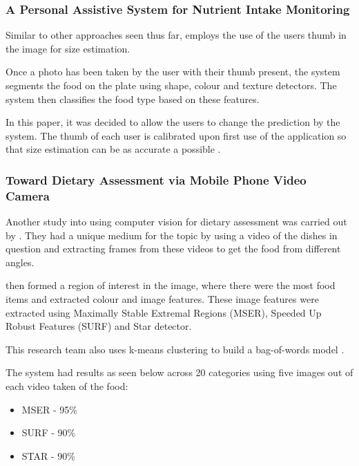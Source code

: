 
\subsubsection*{A Personal Assistive System for Nutrient Intake Monitoring}
Similar to other approaches seen thus far, \parencite{personalAssistive} employs the use of the users thumb in the image for size estimation.

Once a photo has been taken by the user with their thumb present, the system segments the food on the plate using shape, colour and texture detectors.
The system then classifies the food type based on these features.

In this paper, it was decided to allow the users to change the prediction by the system.
The thumb of each user is calibrated upon first use of the application so that size estimation can be as accurate a possible \parencite{personalAssistive}.

\subsubsection*{Toward Dietary Assessment via Mobile Phone Video Camera}
Another study into using computer vision for dietary assessment was carried out by \parencite{chen2010toward}. They had a unique medium for the topic by using a video of the dishes in question and extracting frames from these videos to get the food from different angles.

\parencite{chen2010toward} then formed a region of interest in the image, where there were the most food items and extracted colour and image features.
These image features were extracted using Maximally Stable Extremal Regions (MSER), Speeded Up Robust Features (SURF) and Star detector.

This research team also uses k-means clustering to build a bag-of-words model \parencite{chen2010toward}.

The system had results as seen below across 20 categories using five images out of each video taken of the food:
\begin{itemize}
	\item{MSER - 95\%}
	\item{SURF - 90\%}
	\item{STAR - 90\%}
\end{itemize}

